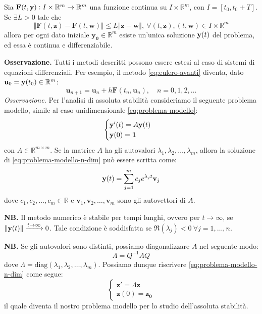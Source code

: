 \begin{theorem}
Sia $\mathbf{F}( t,\mathbf{y}) :I\times \mathbb{R}^{m}\rightarrow \mathbb{R}^{m}$ una funzione continua su $I\times \mathbb{R}^{m}$, con $I=[ t_{0} ,t_{0} +T]$. Se $\exists L >0$ tale che
$$\Vert \mathbf{F}( t,\mathbf{z}) -\mathbf{F}( t,\mathbf{w})\Vert \leqslant L\Vert \mathbf{z} -\mathbf{w}\Vert ,\ \forall ( t,\mathbf{z}) ,( t,\mathbf{w}) \in I\times \mathbb{R}^{m}$$
allora per ogni dato iniziale $\mathbf{y_{0}} \in \mathbb{R}^{m}$ esiste un'unica soluzione $\mathbf{y}(t)$ del problema, ed essa è continua e differenziabile.
\end{theorem}
\textbf{Osservazione. }Tutti i metodi descritti possono essere estesi al caso di sistemi di equazioni differenziali.
Per esempio, il metodo \eqref{eq:eulero-avanti} diventa, dato $\mathbf{u}_{0} =\mathbf{y}( t_{0}) \in \mathbb{R}^{m}$:
\begin{equation*}
\mathbf{u}_{n+1} =\mathbf{u}_{n} +h\mathbf{F}( t_{n} ,\mathbf{u}_{n}) ,\quad n=0,1,2,\dotsc
\end{equation*}
\textit{Osservazione.} Per l'analisi di assoluta stabilità consideriamo il seguente problema modello, simile al caso unidimensionale \eqref{eq:problema-modello}:
\begin{equation}
\begin{cases}
\mathbf{y} '(t) =A\mathbf{y}(t)\\
\mathbf{y}(0) =\mathbf{1}
\end{cases}
\label{eq:problema-modello-n-dim}
\end{equation}
con $A\in \mathbb{R}^{m\times m}$. Se la matrice $A$ ha gli autovalori $\lambda _{1} ,\lambda _{2} ,\dotsc ,\lambda _{m}$, allora la soluzione di \eqref{eq:problema-modello-n-dim} può essere scritta come:
\begin{equation*}
\mathbf{y}(t) =\sum\limits ^{m}_{j=1} c_{j} e^{\lambda _{j} t}\mathbf{v}_{j}
\end{equation*}
dove $c_{1} ,c_{2} ,\dotsc ,c_{m} \in \mathbb{R}$ e $\mathbf{v}_{1} ,\mathbf{v}_{2} ,\dotsc ,\mathbf{v}_{m}$ sono gli autovettori di $A$.

\textbf{NB.}
Il metodo numerico è stabile per tempi lunghi, ovvero per $t\rightarrow \infty$, se $\Vert \mathbf{y}(t)\Vert \xrightarrow{t\rightarrow \infty } 0$. Tale condizione è soddisfatta se $\Re ( \lambda _{j}) < 0 \ \forall j=1,\dotsc ,n$.

\textbf{NB.}
Se gli autovalori sono distinti, possiamo diagonalizzare $A$ nel seguente modo:
\begin{equation*}
\Lambda =Q^{-1} AQ
\end{equation*}
dove $\Lambda =\mathrm{diag}( \lambda _{1} ,\lambda _{2} ,\dotsc ,\lambda _{m})$.
Possiamo dunque riscrivere \eqref{eq:problema-modello-n-dim} come segue:
\begin{equation*}
\begin{cases}
\mathbf{z} '=\Lambda \mathbf{z}\\
\mathbf{z}(0) =\mathbf{z_{0}}
\end{cases}
\end{equation*}
il quale diventa il nostro problema modello per lo studio dell'assoluta stabilità.

